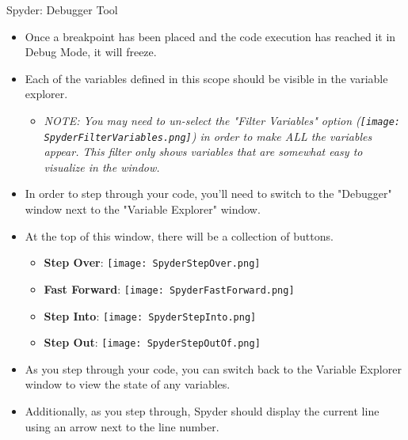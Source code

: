 \documentclass[10pt, aspectratio=169]{beamer}
\begin{document}
\begin{frame}{Spyder: Debugger Tool}
    \begin{itemize}
        \item Once a breakpoint has been placed and the code execution has reached it in Debug Mode, it will freeze.
        \item Each of the variables defined in this scope should be visible in the variable explorer.
        \begin{itemize}
            \item \textit{NOTE: You may need to un-select the "Filter Variables" option (\texttt{[image: SpyderFilterVariables.png]}) in order to make ALL the variables appear. This filter only shows variables that are somewhat easy to visualize in the window.}
        \end{itemize}
        \item In order to step through your code, you'll need to switch to the "Debugger" window next to the "Variable Explorer" window.
        \item At the top of this window, there will be a collection of buttons.
        \begin{itemize}
            \item \textbf{Step Over}: \texttt{[image: SpyderStepOver.png]}
            \item \textbf{Fast Forward}: \texttt{[image: SpyderFastForward.png]}
            \item \textbf{Step Into}: \texttt{[image: SpyderStepInto.png]}
            \item \textbf{Step Out}: \texttt{[image: SpyderStepOutOf.png]}
        \end{itemize}
        \item As you step through your code, you can switch back to the Variable Explorer window to view the state of any variables.
        \item Additionally, as you step through, Spyder should display the current line using an arrow next to the line number.
    \end{itemize}
\end{frame}
\end{document}
